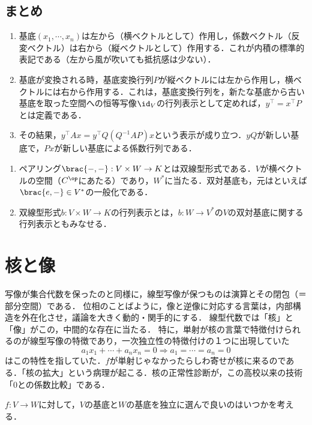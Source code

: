 \documentclass[uplatex, dvipdfmx]{jsreport}
\begin{document}
\subsection{まとめ}

\begin{enumerate}
    \item 基底$(x_1,\cdots,x_n)$は左から（横ベクトルとして）作用し，係数ベクトル（反変ベクトル）は右から（縦ベクトルとして）作用する．これが内積の標準的表記である（左から風が吹いても抵抗感は少ない）．
    \item 基底が変換される時，基底変換行列$P$が縦ベクトルには左から作用し，横ベクトルには右から作用する．これは，基底変換行列を，新たな基底から古い基底を取った空間への恒等写像$\id_V$の行列表示として定めれば，$y^\top=x^\top P$とは定義である．
    \item その結果，$y^\top Ax=y^\top Q(Q^{-1}AP)x$という表示が成り立つ．$yQ$が新しい基底で，$Px$が新しい基底による係数行列である．
\end{enumerate}

\begin{enumerate}
    \item ペアリング$\brac{-,-}:V\times W\to K$とは双線型形式である．$V$が横ベクトルの空間（$C^\op$にあたる）であり，$W^*$に当たる．双対基底も，元はといえば$\brac{e,-}\in V^*$の一般化である．
    \item 双線型形式$b:V\times W\to K$の行列表示とは，$b:W\to V^*$の$V$の双対基底に関する行列表示ともみなせる．
\end{enumerate}

\section{核と像}

\begin{tcolorbox}[colframe=ForestGreen, colback=ForestGreen!10!white, breakable]
    写像が集合代数を保ったのと同様に，線型写像が保つものは演算とその閉包（＝部分空間）である．
    位相のことばように，像と逆像に対応する言葉は，内部構造を外在化させ，議論を大きく動的・関手的にする．
    線型代数では「核」と「像」がこの，中間的な存在に当たる．
    特に，単射が核の言葉で特徴付けられるのが線型写像の特徴であり，一次独立性の特徴付けの１つに出現していた
    \[a_1x_1+\cdots+a_nx_n=0\Rightarrow a_1=\cdots=a_n=0 \]
    はこの特性を指していた．$f$が単射じゃなかったらしわ寄せが核に来るのである．「核の拡大」という病理が起こる．核の正常性診断が，この高校以来の技術「$0$との係数比較」である．

    $f:V\to W$に対して，$V$の基底と$W$の基底を独立に選んで良いのはいつかを考える．
\end{tcolorbox}
\end{document}
